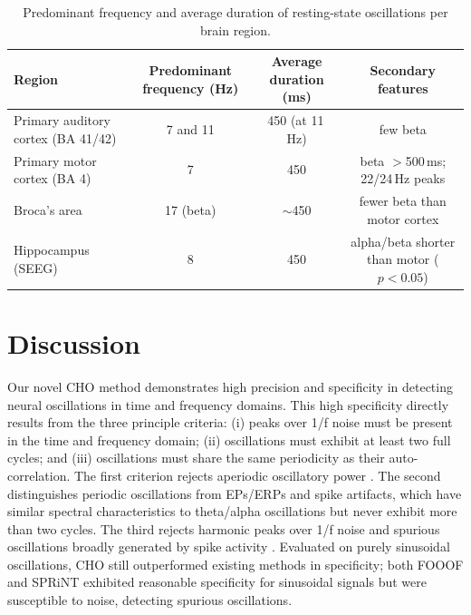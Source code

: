 \documentclass[11pt]{article}
\begin{document}
\begin{table}[htbp]
\centering
\caption{Predominant frequency and average duration of resting-state oscillations per brain region.}
\label{tab:freqdur}
\begin{tabular}{lccc}
\toprule
Region & Predominant frequency (Hz) & Average duration (ms) & Secondary features \\
\midrule
Primary auditory cortex (BA 41/42) & 7 and 11 & 450 (at 11\,Hz) & few beta \\
Primary motor cortex (BA 4)        & 7        & 450             & beta $>$500\,ms; 22/24\,Hz peaks \\
Broca's area                       & 17 (beta) & $\sim$450      & fewer beta than motor cortex \\
Hippocampus (SEEG)                 & 8        & 450             & alpha/beta shorter than motor ($p<0.05$) \\
\bottomrule
\end{tabular}
\end{table}

\section{Discussion}
Our novel CHO method demonstrates high precision and specificity in detecting neural oscillations in time and frequency domains. This high specificity directly results from the three principle criteria: (i) peaks over 1/f noise must be present in the time and frequency domain; (ii) oscillations must exhibit at least two full cycles; and (iii) oscillations must share the same periodicity as their auto-correlation. The first criterion rejects aperiodic oscillatory power \citep{donoghue2020}. The second distinguishes periodic oscillations from EPs/ERPs and spike artifacts, which have similar spectral characteristics to theta/alpha oscillations but never exhibit more than two cycles. The third rejects harmonic peaks over 1/f noise and spurious oscillations broadly generated by spike activity \citep{decheveigne2019}. Evaluated on purely sinusoidal oscillations, CHO still outperformed existing methods in specificity; both FOOOF and SPRiNT exhibited reasonable specificity for sinusoidal signals but were susceptible to noise, detecting spurious oscillations.
\end{document}
